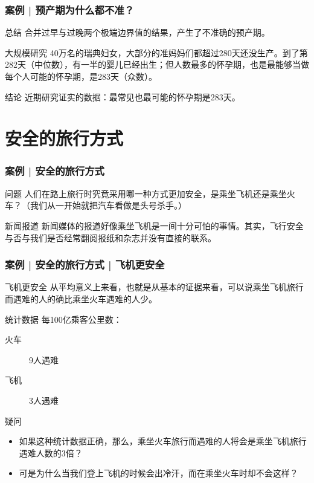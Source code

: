 \begin{frame}
  \frametitle{案例 | 预产期为什么都不准？}
  \begin{block}{总结}
    合并过早与过晚两个极端边界值的结果，产生了不准确的预产期。
  \end{block}
  \pause
  \begin{block}{大规模研究}
    40万名的瑞典妇女，大部分的准妈妈们都超过280天还没生产。到了第282天（中位数），有一半的婴儿已经出生；但人数最多的怀孕期，也是最能够当做每个人可能的怀孕期，是283天（众数）。
  \end{block}
  \pause
  \begin{block}{结论}
    近期研究证实的数据：最常见也最可能的怀孕期是283天。
  \end{block}
\end{frame}

\section{安全的旅行方式}
\begin{frame}
  \frametitle{案例 | 安全的旅行方式}
  \begin{block}{问题}
    人们在路上旅行时究竟采用哪一种方式更加安全，是乘坐飞机还是乘坐火车？（我们从一开始就把汽车看做是头号杀手。）
  \end{block}
  \pause
  \begin{block}{新闻报道}
    新闻媒体的报道好像乘坐飞机是一间十分可怕的事情。其实，飞行安全与否与我们是否经常翻阅报纸和杂志并没有直接的联系。
  \end{block}
\end{frame}

\begin{frame}
  \frametitle{案例 | 安全的旅行方式 | 飞机更安全}
  \begin{block}{飞机更安全}
    从平均意义上来看，也就是从基本的证据来看，可以说乘坐飞机旅行而遇难的人的确比乘坐火车遇难的人少。
  \end{block}
  \pause
  \begin{block}{统计数据}
    每100亿乘客公里数：
    \begin{description}
      \item[火车] 9人遇难
      \item[飞机] 3人遇难
    \end{description}
  \end{block}
  \pause
  \begin{block}{疑问}
    \begin{itemize}
      \item 如果这种统计数据正确，那么，乘坐火车旅行而遇难的人将会是乘坐飞机旅行遇难人数的3倍？
      \item 可是为什么当我们登上飞机的时候会出冷汗，而在乘坐火车时却不会这样？
    \end{itemize}
  \end{block}
\end{frame}

